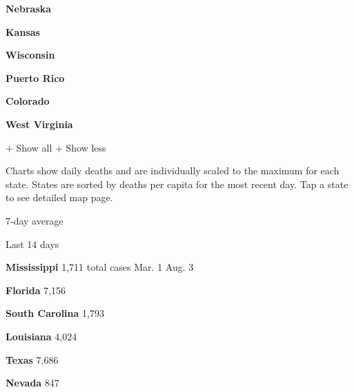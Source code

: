 \textbf{Nebraska}

\href{https://www.nytimes.com/interactive/2020/us/kansas-coronavirus-cases.html}{}

\textbf{Kansas}

\href{https://www.nytimes.com/interactive/2020/us/wisconsin-coronavirus-cases.html}{}

\textbf{Wisconsin}

\href{https://www.nytimes.com/interactive/2020/us/puerto-rico-coronavirus-cases.html}{}

\textbf{Puerto Rico}

\href{https://www.nytimes.com/interactive/2020/us/colorado-coronavirus-cases.html}{}

\textbf{Colorado}

\href{https://www.nytimes.com/interactive/2020/us/west-virginia-coronavirus-cases.html}{}

\textbf{West Virginia}

+ Show all + Show less

Charts show daily deaths and are individually scaled to the maximum for
each state. States are sorted by deaths per capita for the most recent
day. Tap a state to see detailed map page.

\href{https://www.nytimes.com/interactive/2020/us/mississippi-coronavirus-cases.html}{}

7-day average

Last 14 days

\textbf{Mississippi} 1,711 total cases Mar. 1 Aug. 3

\href{https://www.nytimes.com/interactive/2020/us/florida-coronavirus-cases.html}{}

\textbf{Florida} 7,156

\href{https://www.nytimes.com/interactive/2020/us/south-carolina-coronavirus-cases.html}{}

\textbf{South Carolina} 1,793

\href{https://www.nytimes.com/interactive/2020/us/louisiana-coronavirus-cases.html}{}

\textbf{Louisiana} 4,024

\href{https://www.nytimes.com/interactive/2020/us/texas-coronavirus-cases.html}{}

\textbf{Texas} 7,686

\href{https://www.nytimes.com/interactive/2020/us/nevada-coronavirus-cases.html}{}

\textbf{Nevada} 847

\href{https://www.nytimes.com/interactive/2020/us/georgia-coronavirus-cases.html}{}

